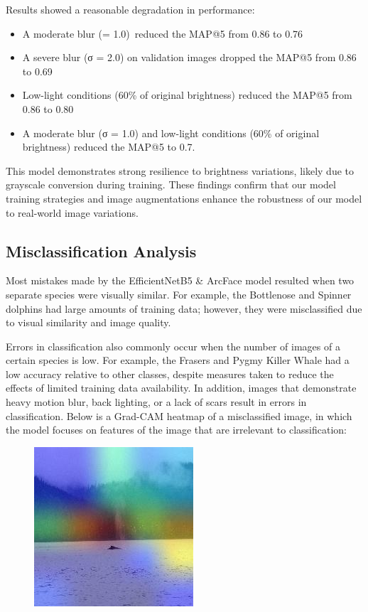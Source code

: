 \documentclass[twocolumn]{article}
\begin{document}
Results showed a reasonable degradation in performance:
 \begin{itemize}
     \item A moderate blur (\σ = 1.0)\ reduced the MAP@5 from 0.86 to 0.76
     \item A severe blur (σ = 2.0) on validation images dropped the MAP@5 from 0.86 to 0.69
     \item Low-light conditions (60\% of original brightness) reduced the MAP@5 from 0.86 to 0.80
     \item A moderate blur (σ = 1.0) and low-light conditions (60\% of original brightness) reduced the MAP@5 to 0.7.
 \end{itemize}

This model demonstrates strong resilience to brightness variations, likely due to grayscale conversion during training. These findings confirm that our model training strategies and image augmentations enhance the robustness of our model to real-world image variations.

\subsection{Misclassification Analysis}

Most mistakes made by the EfficientNetB5 \& ArcFace model resulted when two separate species were visually similar. For example, the Bottlenose and Spinner dolphins had large amounts of training data; however, they were misclassified due to visual similarity and image quality. 

Errors in classification also commonly occur when the number of images of a certain species is low. For example, the Frasers and Pygmy Killer Whale had a low accuracy relative to other classes, despite measures taken to reduce the effects of limited training data availability. In addition, images that demonstrate heavy motion blur, back lighting, or a lack of scars result in errors in classification. Below is a Grad-CAM heatmap of a misclassified image, in which the model focuses on features of the image that are irrelevant to classification:
\begin{figure}
    \centering
    \includegraphics[width=0.5\linewidth]{misclassified.jpg}
\end{figure}
\end{document}
